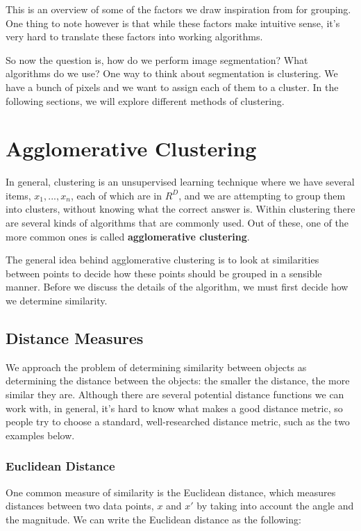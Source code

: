 \documentclass{article}
\begin{document}
This is an overview of some of the factors we draw inspiration from for grouping. One thing to note however is that while these factors make intuitive sense, it's very hard to translate these factors into working algorithms.

So now the question is, how do we perform image segmentation? What algorithms do we use? One way to think about segmentation is clustering. We have a bunch of pixels and we want to assign each of them to a cluster. In the following sections, we will explore different methods of clustering.

\section{Agglomerative Clustering}

In general, clustering is an unsupervised learning technique where we have several items, $x_1, ..., x_n$, each of which are in $R^D$, and we are attempting to group them into clusters, without knowing what the correct answer is. Within clustering there are several kinds of algorithms that are commonly used. Out of these, one of the more common ones is called \textbf{agglomerative clustering}. 

The general idea behind agglomerative clustering is to look at similarities between points to decide how these points should be grouped in a sensible manner. Before we discuss the details of the algorithm, we must first decide how we determine similarity.

\subsection{Distance Measures}

We approach the problem of determining similarity between objects as determining the distance between the objects: the smaller the distance, the more similar they are. Although there are several potential distance functions we can work with, in general, it's hard to know what makes a good distance metric, so people try to choose a standard, well-researched distance metric, such as the two examples below.

\subsubsection{Euclidean Distance}

One common measure of similarity is the Euclidean distance, which measures distances between two data points, $x$ and $x'$ by taking into account the angle and the magnitude. We can write the Euclidean distance as the following:
\end{document}
